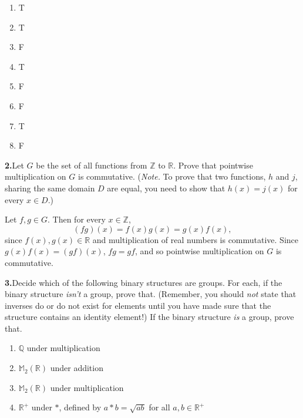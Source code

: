 \documentclass[10pt,]{book}
\theoremstyle{plain}
\theoremstyle{definition}
\theoremstyle{definition}
\theoremstyle{definition}
\theoremstyle{definition}
\numberwithin{equation}{section}
\def\Z{\mathbb{Z}}
\def\R{\mathbb{R}}
\def\Q{\mathbb{Q}}
\def\M{\mathbb{M}}
\begin{document}
\leavevmode%
\begin{multicols}{4}
\begin{enumerate}[label=(\alph*)]
\item\hypertarget{li-97}{}T%
\item\hypertarget{li-98}{}T%
\item\hypertarget{li-99}{}F%
\item\hypertarget{li-100}{}T%
\item\hypertarget{li-101}{}F%
\item\hypertarget{li-102}{}F%
\item\hypertarget{li-103}{}T%
\item\hypertarget{li-104}{}F%
\end{enumerate}
\end{multicols}
\par\smallskip
\noindent\textbf{2.}\quad{}Let \(G\) be the set of all functions from \(\Z\) to \(\R\). Prove that pointwise multiplication on \(G\) is commutative. (\emph{Note.} To prove that two functions, \(h\) and \(j\), sharing the same domain \(D\) are equal, you need to show that \(h(x)=j(x)\) for every \(x\in D\).)%
\par\smallskip
Let \(f,g\in G\). Then for every \(x\in \Z\),%
\begin{equation*}
(fg)(x)=f(x)g(x)=g(x)f(x),
\end{equation*}
since \(f(x), g(x)\in \R\) and multiplication of real numbers is commutative. Since \(g(x)f(x)=(gf)(x)\), \(fg=gf\), and so pointwise multiplication on \(G\) is commutative.%
\par\smallskip
\noindent\textbf{3.}\quad{}Decide which of the following binary structures are groups. For each, if the binary structure \emph{isn't} a group, prove that. (Remember, you should \emph{not} state that inverses do or do not exist for elements until you have made sure that the structure contains an identity element!) If the binary structure \emph{is} a group, prove that. \leavevmode%
\begin{enumerate}[label=(\alph*)]
\item\hypertarget{li-105}{}\(\Q\) under multiplication%
\item\hypertarget{li-106}{}\(\M_2(\R)\) under addition%
\item\hypertarget{li-107}{}\(\M_2(\R)\) under multiplication%
\item\hypertarget{li-108}{}\(\R^+\) under \(*\), defined by \(a*b=\sqrt{ab}\) for all \(a,b\in \R^+\)%
\end{enumerate}
\end{document}
